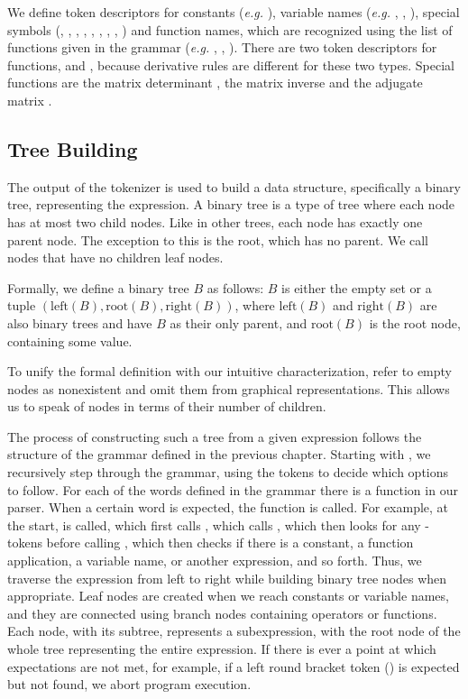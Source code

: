 \documentclass[12pt, a4paper]{report} %
\begin{document}
We define token descriptors for constants (\textit{e.g.} ), variable names (\textit{e.g.} , , ), special symbols (, , , , , , , , ) and function names, which are recognized using the list of functions given in the grammar (\textit{e.g.}  , , ).
There are two token descriptors for functions,  and , because derivative rules are different for these two types.
Special functions are the matrix determinant , the matrix inverse  and the adjugate matrix .

\subsection{Tree Building}
The output of the tokenizer is used to build a data structure, specifically a binary tree, representing the expression.
A binary tree is a type of tree where each node has at most two child nodes.
Like in other trees, each node has exactly one parent node.
The exception to this is the root, which has no parent.
We call nodes that have no children leaf nodes.

Formally, we define a binary tree $B$ as follows:
$B$ is either the empty set or a tuple $(\text{left}(B),\text{root}(B),\text{right}(B))$, where $\text{left}(B)$ and $\text{right}(B)$ are also binary trees and have $B$ as their only parent, and $\text{root}(B)$ is the root node, containing some value.

To unify the formal definition with our intuitive characterization, refer to empty nodes as nonexistent and omit them from graphical representations.
This allows us to speak of nodes in terms of their number of children.

The process  of constructing such a tree from a given expression follows the structure of the grammar defined in the previous chapter.
Starting with , we recursively step through the grammar, using the tokens to decide which options to follow.
For each of the words defined in the grammar there is a function in our parser.
When a certain word is expected, the function is called.
For example, at the start,  is called, which first calls , which calls , which then looks for any -tokens before calling , which then checks if there is a constant, a function application, a variable name, or another expression, and so forth.
Thus, we traverse the expression from left to right while building binary tree nodes when appropriate.
Leaf nodes are created when we reach constants or variable names, and they are connected using branch nodes containing operators or functions.
Each node, with its subtree, represents a subexpression, with the root node of the whole tree representing the entire expression.
If there is ever a point at which expectations are not met, for example, if a left round bracket token () is expected but not found, we abort program execution.
\end{document}
